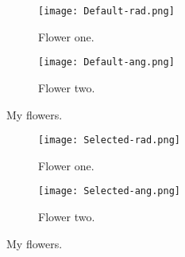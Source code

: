 \begin{figure}[!tbp]
\begin{adjustbox}{max width=1.2\linewidth,center}
\centering
  \begin{subfigure}[b]{0.55\textwidth}
      \texttt{[image: Default-rad.png]}
    \caption{Flower one.}
    \label{fig:f1}
  \end{subfigure}
  \hfill
  \begin{subfigure}[b]{0.55\textwidth}
      \texttt{[image: Default-ang.png]}
    \caption{Flower two.}
    \label{fig:f2}
  \end{subfigure}
\end{adjustbox}
\caption{My flowers.}
    \label{fig:default}
\end{figure}

\begin{figure}[!tbp]
\begin{adjustbox}{max width=1.2\linewidth,center}
\centering
  \begin{subfigure}[b]{0.55\textwidth}
      \texttt{[image: Selected-rad.png]}
    \caption{Flower one.}
    \label{fig:f1}
  \end{subfigure}
  \hfill
  \begin{subfigure}[b]{0.55\textwidth}
      \texttt{[image: Selected-ang.png]}
    \caption{Flower two.}
    \label{fig:f2}
  \end{subfigure}
\end{adjustbox}
\caption{My flowers.}
    \label{fig:selected}
\end{figure}

